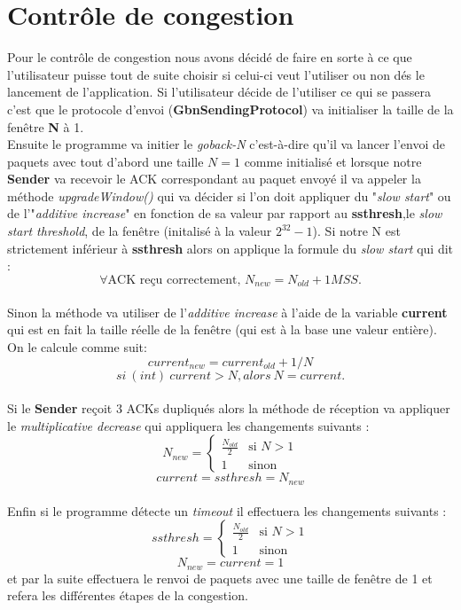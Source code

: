 \documentclass[11pt]{article}
\begin{document}
\section{Contrôle de congestion}
Pour le contrôle de congestion nous avons décidé de faire en sorte à ce que l'utilisateur puisse tout de suite choisir si celui-ci veut l'utiliser ou non dés le lancement de l'application. Si l'utilisateur décide de l'utiliser ce qui se passera c'est que le protocole d'envoi (\textbf{GbnSendingProtocol}) va initialiser la taille de la fenêtre \textbf{N} à 1. \\ 
Ensuite le programme va initier le \textit{goback-N} c'est-à-dire qu'il va lancer l'envoi de paquets avec tout d'abord une taille $N=1$ comme initialisé et lorsque notre \textbf{Sender} va recevoir le ACK correspondant au paquet envoyé il va appeler la méthode \textit{upgradeWindow()} qui va décider si l'on doit appliquer du "\textit{slow start}" ou de l'"\textit{additive increase}" en fonction de sa valeur par rapport au \textbf{ssthresh},le \textit{slow start threshold}, de la fenêtre (initalisé à la valeur $2^{32}-1$). Si notre N est strictement inférieur à \textbf{ssthresh} alors on applique la formule du \textit{slow start} qui dit : \[
\forall \text{ACK reçu correctement, }N_{new} = N_{old}+1 MSS.
\]\\
Sinon la méthode va utiliser de l'\textit{additive increase} à l'aide de la variable \textbf{current} qui est en fait la taille réelle de la fenêtre (qui est à la base une valeur entière). On le calcule comme suit:
\[
current_{new} = current_{old}+1/N 
\]
\[
si \ (int)\ current > N, alors \ N = current.
\]
\\
Si le \textbf{Sender} reçoit 3 ACKs dupliqués alors la méthode de réception va appliquer le \textit{multiplicative decrease} qui appliquera les changements suivants : 
\[
N_{new} = \begin{cases}
\frac{N_{old}}{2} & \text{si } N > 1 \\
1 & \text{sinon}
\end{cases}
\] 
\[
current = ssthresh = N_{new} 
\]\\
Enfin si le programme détecte un \textit{timeout} il effectuera les changements suivants :
\[
ssthresh = \begin{cases}
\frac{N_{old}}{2} & \text{si } N>1 \\
1 & \text{sinon}
\end{cases}
\]
\[
N_{new}=current = 1
\]
et par la suite effectuera le renvoi de paquets avec une taille de fenêtre de 1 et refera les différentes étapes de la congestion.\\
\end{document}
